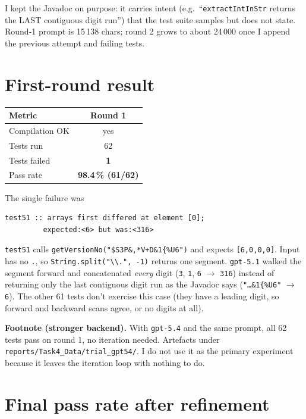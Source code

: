 \documentclass[manuscript,review,nonacm]{acmart}
\begin{document}
I kept the Javadoc on purpose: it carries intent (e.g.\
``\texttt{extractIntInStr} returns the LAST contiguous digit run'')
that the test suite samples but does not state. Round-1 prompt is
15\,138 chars; round 2 grows to about 24\,000 once I append the
previous attempt and failing tests.

\section{First-round result}

\begin{tabular}{lc}
\toprule
Metric          & Round 1 \\
\midrule
Compilation OK  & yes \\
Tests run       & 62 \\
Tests failed    & \textbf{1} \\
Pass rate       & \textbf{98.4\,\% (61/62)} \\
\bottomrule
\end{tabular}

\medskip

The single failure was

\begin{lstlisting}
test51 :: arrays first differed at element [0];
         expected:<6> but was:<316>
\end{lstlisting}

\texttt{test51} calls
\texttt{getVersionNo("\$S3P\&,*V+D\&1\{\%U6")} and expects
\texttt{[6,0,0,0]}. Input has no \texttt{.}, so
\texttt{String.split("\textbackslash{}\textbackslash{}.", -1)} returns
one segment. \texttt{gpt-5.1} walked the segment forward and
concatenated \emph{every} digit (\texttt{3}, \texttt{1}, \texttt{6}
$\to$ \texttt{316}) instead of returning only the last contiguous
digit run as the Javadoc says (\texttt{"\dots\&1\{\%U6"} $\to$
\texttt{6}). The other 61 tests don't exercise this case (they have
a leading digit, so forward and backward scans agree, or no digits at
all).

\medskip
\noindent\textbf{Footnote (stronger backend).} With \texttt{gpt-5.4}
and the same prompt, all 62 tests pass on round 1, no iteration
needed. Artefacts under \texttt{reports/Task4\_Data/trial\_gpt54/}. I
do not use it as the primary experiment because it leaves the
iteration loop with nothing to do.

\section{Final pass rate after refinement}
\end{document}
